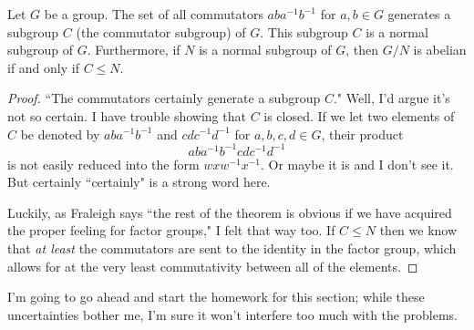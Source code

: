 \documentclass{article}
\newenvironment{theorem}[1]{\noindent {\bf Theorem #1:}}
{\medskip}
\begin{document}
\begin{theorem}{15.20} Let $G$ be a group. The set of all commutators $aba^{-1}b^{-1}$ for $a,b\in G$ generates a subgroup $C$ (the commutator subgroup) of $G$. This subgroup $C$ is a normal subgroup of $G$. Furthermore, if $N$ is a normal subgroup of $G$, then $G/N$ is abelian if and only if $C\le N$.\end{theorem}

\begin{proof} ``The commutators certainly generate a subgroup $C$." Well, I'd argue it's not so certain. I have trouble showing that $C$ is closed. If we let two elements of $C$ be denoted by $aba^{-1}b^{-1}$ and $cdc^{-1}d^{-1}$ for $a,b,c,d\in G$, their product $$aba^{-1}b^{-1}cdc^{-1}d^{-1}$$ is not easily reduced into the form $wxw^{-1}x^{-1}$. Or maybe it is and I don't see it. But certainly ``certainly" is a strong word here.

Luckily, as Fraleigh says ``the rest of the theorem is obvious if we have acquired the proper feeling for factor groups," I felt that way too. If $C\le N$ then we know that \emph{at least} the commutators are sent to the identity in the factor group, which allows for at the very least commutativity between all of the elements.
\end{proof}

I'm going to go ahead and start the homework for this section; while these uncertainties bother me, I'm sure it won't interfere too much with the problems.
\end{document}
